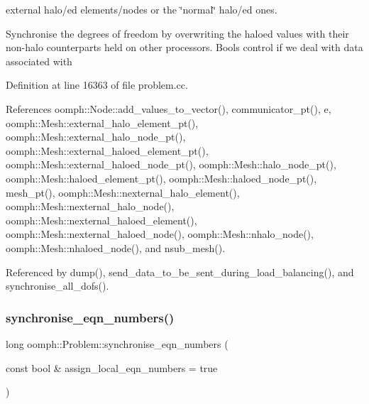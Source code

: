 external halo/ed elements/nodes or the \char`\"{}normal\char`\"{} halo/ed ones.

Synchronise the degrees of freedom by overwriting the haloed values with their non-\/halo counterparts held on other processors. Bools control if we deal with data associated with 

Definition at line 16363 of file problem.\+cc.



References oomph\+::\+Node\+::add\+\_\+values\+\_\+to\+\_\+vector(), communicator\+\_\+pt(), e, oomph\+::\+Mesh\+::external\+\_\+halo\+\_\+element\+\_\+pt(), oomph\+::\+Mesh\+::external\+\_\+halo\+\_\+node\+\_\+pt(), oomph\+::\+Mesh\+::external\+\_\+haloed\+\_\+element\+\_\+pt(), oomph\+::\+Mesh\+::external\+\_\+haloed\+\_\+node\+\_\+pt(), oomph\+::\+Mesh\+::halo\+\_\+node\+\_\+pt(), oomph\+::\+Mesh\+::haloed\+\_\+element\+\_\+pt(), oomph\+::\+Mesh\+::haloed\+\_\+node\+\_\+pt(), mesh\+\_\+pt(), oomph\+::\+Mesh\+::nexternal\+\_\+halo\+\_\+element(), oomph\+::\+Mesh\+::nexternal\+\_\+halo\+\_\+node(), oomph\+::\+Mesh\+::nexternal\+\_\+haloed\+\_\+element(), oomph\+::\+Mesh\+::nexternal\+\_\+haloed\+\_\+node(), oomph\+::\+Mesh\+::nhalo\+\_\+node(), oomph\+::\+Mesh\+::nhaloed\+\_\+node(), and nsub\+\_\+mesh().



Referenced by dump(), send\+\_\+data\+\_\+to\+\_\+be\+\_\+sent\+\_\+during\+\_\+load\+\_\+balancing(), and synchronise\+\_\+all\+\_\+dofs().

\mbox{\label{classoomph_1_1Problem_a9a9ce9ee869ff79ee5596e434309f379}} 
\subsubsection{\texorpdfstring{synchronise\+\_\+eqn\+\_\+numbers()}{synchronise\_eqn\_numbers()}}
{\footnotesize\ttfamily long oomph\+::\+Problem\+::synchronise\+\_\+eqn\+\_\+numbers (\begin{DoxyParamCaption}\item[{const bool \&}]{assign\+\_\+local\+\_\+eqn\+\_\+numbers = {\ttfamily true} }\end{DoxyParamCaption})}



